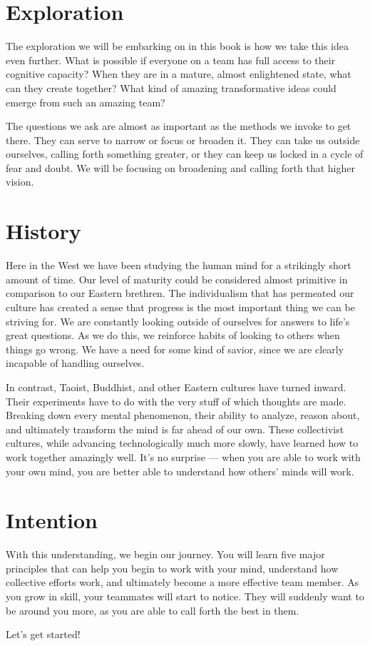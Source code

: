 \section{Exploration}

The exploration we will be embarking on in this book is how we take this idea even further. What is possible
if everyone on a team has full access to their cognitive capacity? When they are in a mature, almost
enlightened state, what can they create together? What kind of amazing transformative ideas could emerge
from such an amazing team?

The questions we ask are almost as important as the methods we invoke to get there. They can serve
to narrow or focus or broaden it. They can take us outside ourselves, calling forth something greater, or
they can keep us locked in a cycle of fear and doubt. We will be focusing on broadening and calling
forth that higher vision.

\section{History}

Here in the West we have been studying the human mind for a strikingly short amount of time. Our
level of maturity could be considered almost primitive in comparison to our Eastern brethren. The
individualism that has permeated our culture has created a sense that progress is the most important
thing we can be striving for. We are constantly looking outside of ourselves for answers to life's 
great questions. As we do this, we reinforce habits of looking to others when things go wrong. We
have a need for some kind of savior, since we are clearly incapable of handling ourselves.

In contrast, Taoist, Buddhist, and other Eastern cultures have turned inward. Their experiments have
to do with the very stuff of which thoughts are made. Breaking down every mental phenomenon, their 
ability to analyze, reason about, and ultimately transform the mind is far ahead of our own. These
collectivist cultures, while advancing technologically much more slowly, have learned how to work 
together amazingly well. It's no surprise --- when you are able to work with your own mind, you 
are better able to understand how others' minds will work.

\section{Intention}

With this understanding, we begin our journey. You will learn five major principles that can help
you begin to work with your mind, understand how collective efforts work, and ultimately become
a more effective team member. As you grow in skill, your teammates will start to notice. They will 
suddenly want to be around you more, as you are able to call forth the best in them.

Let's get started! 